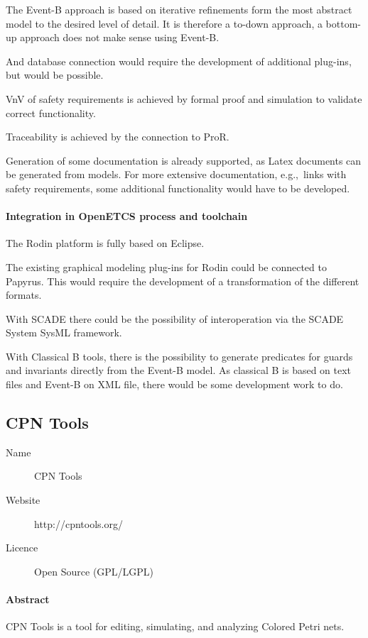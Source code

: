 The Event-B approach is based on iterative refinements form the most abstract
  model to the desired level of detail. It is therefore a to-down approach, a
  bottom-up approach does not make sense using Event-B.

  And database connection would require the development of additional plug-ins,
  but would be possible.

  VnV of safety requirements is achieved by formal proof and simulation to
  validate correct functionality.

  Traceability is achieved by the connection to ProR.

  Generation of some documentation is already supported, as Latex documents can
  be generated from models. For more extensive documentation, e.g.,\ links with
  safety requirements, some additional functionality would have to be developed.
\

\paragraph{Integration in OpenETCS process and toolchain}

  The Rodin platform is fully based on Eclipse.

  The existing graphical modeling plug-ins for Rodin could be connected to
  Papyrus. This would require the development of a transformation of the
  different formats.

  With SCADE there could be the possibility of interoperation via the SCADE
  System SysML framework.

  With Classical B tools, there is the possibility to generate predicates for
  guards and invariants directly from the Event-B model. As classical B is based
  on text files and Event-B on XML file, there would be some development work to
  do.
  
 \subsection{CPN Tools}
 \label{sec:CPN}
 
 \begin{description}
 \item[Name] CPN Tools
 \item[Website] http://cpntools.org/
 \item[Licence] Open Source (GPL/LGPL)
 \end{description}
 
 \paragraph{Abstract} CPN Tools is a tool for editing, simulating, and analyzing Colored Petri nets.
 
